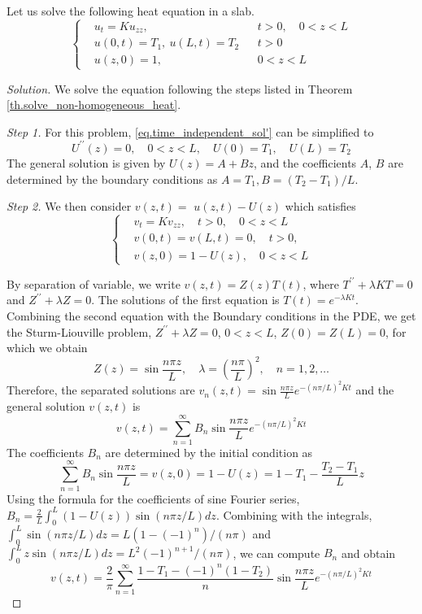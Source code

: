 \begin{example}
    Let us solve the following heat equation in a slab.
    \begin{equation}
        \left\{
        \begin{aligned}
            &u_t=K u_{z z},\quad && t>0, \quad 0<z<L \\
            &u(0, t)=T_1,\ u(L, t)=T_2 && t>0 \\
            &u(z, 0)=1,\quad && 0<z<L
        \end{aligned}
        \right.
    \end{equation}
\end{example}
\begin{proof}[Solution] We solve the equation following the steps listed in Theorem \ref{th.solve_non-homogeneous_heat}.

\textit{Step 1.} For this problem, \eqref{eq.time_independent_sol'} can be simplified to 
$$
U^{\prime \prime}(z)=0, \quad 0<z<L, \quad U(0)=T_1, \quad U(L)=T_2
$$
The general solution is given by $U(z)=A+Bz$, and the coefficients $A$, $B$ are determined by the boundary conditions as $A=T_1, B=(T_2-T_1)/L$. 
    
\textit{Step 2.} We then consider $v(z, t)=$ $u(z, t)-U(z)$ which satisfies
    $$
    \left\{\begin{aligned}
        & v_t=K v_{z z}, \quad t>0, \quad 0<z<L 
        \\
        & v(0, t)=v(L, t)=0, \quad t>0, 
        \\
        &v(z, 0)=1-U(z), \quad 0<z<L
        \end{aligned}\right.
    $$

By separation of variable, we write $v(z, t)=Z(z) T(t)$, where $T^{\prime \prime}+\lambda K T=0$ and $Z^{\prime \prime}+\lambda Z=0$. The solutions of the first equation is $T(t)=e^{-\lambda K t}$. Combining the second equation with the Boundary conditions in the PDE, we get the Sturm-Liouville problem, $Z^{\prime \prime}+\lambda Z=0$, $0<z<L$, $Z(0)=Z(L)=0$, for which we obtain
    $$
    Z(z)=\sin \frac{n \pi z}{L}, \quad \lambda=\left(\frac{n \pi}{L}\right)^2, \quad n=1,2, \ldots
    $$
Therefore, the separated solutions are $v_n(z, t)=\sin \frac{n \pi z}{L} e^{-(n \pi / L)^2 K t}$ and the general solution $v(z, t)$ is
    $$
    v(z, t)=\sum_{n=1}^{\infty} B_n \sin \frac{n \pi z}{L} e^{-(n \pi / L)^2 K t}
    $$
The coefficients $B_n$ are determined by the initial condition as    
    $$
    \sum_{n=1}^{\infty} B_n \sin \frac{n \pi z}{L} = v(z, 0)=1-U(z)=1-T_1-\frac{T_2-T_1}{L} z
    $$
Using the formula for the coefficients of sine Fourier series, $B_n = \frac{2}{L}\int_0^L (1-U(z))\sin (n \pi z / L) d z$. Combining with the integrals, $\int_0^L \sin (n \pi z / L) d z=L\left(1-(-1)^n\right) /(n \pi)$ and $\int_0^L z \sin (n \pi z / L) d z=L^2(-1)^{n+1} /(n \pi)$, we can compute $B_n$ and obtain
    $$
    v(z, t)=\frac{2}{\pi} \sum_{n=1}^{\infty} \frac{1-T_1-(-1)^n\left(1-T_2\right)}{n} \sin \frac{n \pi z}{L} e^{-(n \pi / L)^2 K t}
    $$ 


\end{proof}
